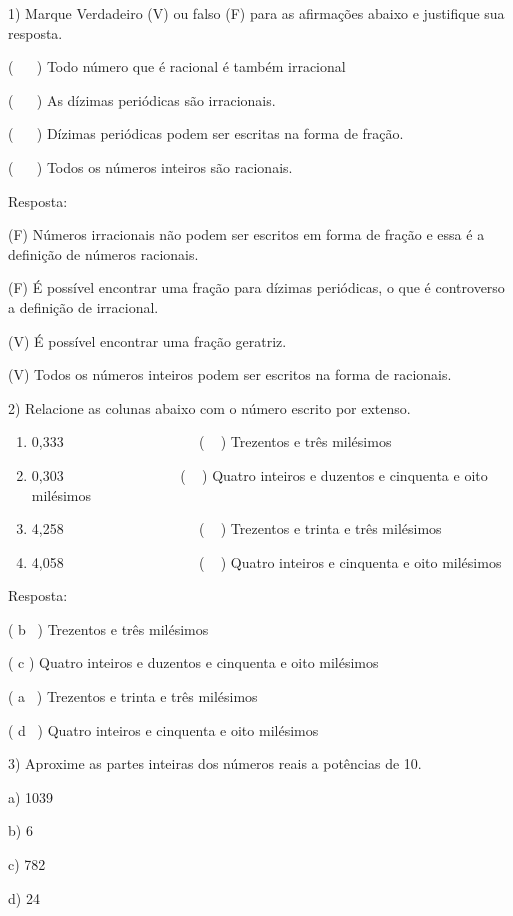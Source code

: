 
1) Marque Verdadeiro (V) ou falso (F) para as afirmações abaixo e
justifique sua resposta.

(~ ~ ) Todo número que é racional é também irracional

(~ ~ ) As dízimas periódicas são irracionais.

(~ ~ ) Dízimas periódicas podem ser escritas na forma de fração.

(~ ~ ) Todos os números inteiros são racionais.~

Resposta:

(F) Números irracionais não podem ser escritos em forma de fração e essa
é a definição de números racionais.

(F) É possível encontrar uma fração para dízimas periódicas, o que é
controverso a definição de irracional.

(V) É possível encontrar uma fração geratriz.

(V) Todos os números inteiros podem ser escritos na forma de racionais.

2) Relacione as colunas abaixo com o número escrito por extenso.

\begin{enumerate}
\def\labelenumi{\alph{enumi})}
\item
  0,333~ ~ ~ ~ ~ ~ ~ ~ ~ ~ ~ ~( ~ ) Trezentos e três milésimos~
\item
  0,303~ ~ ~ ~ ~ ~ ~ ~ ~ ~ ( ~ ) Quatro inteiros e duzentos e cinquenta
  e oito milésimos
\item
  4,258~ ~ ~ ~ ~ ~ ~ ~ ~ ~ ~ ~( ~ ) Trezentos e trinta e três milésimos
\item
  4,058~ ~ ~ ~ ~ ~ ~ ~ ~ ~ ~ ~( ~ ) Quatro inteiros e cinquenta e oito
  milésimos
\end{enumerate}

Resposta:

( b~ ) Trezentos e três milésimos~

( c ) Quatro inteiros e duzentos e cinquenta e oito milésimos

( a~ ) Trezentos e trinta e três milésimos

( d~ ) Quatro inteiros e cinquenta e oito milésimos

3) Aproxime as partes inteiras dos números reais a potências de 10.

a) 1039

b) 6

c) 782

d) 24

